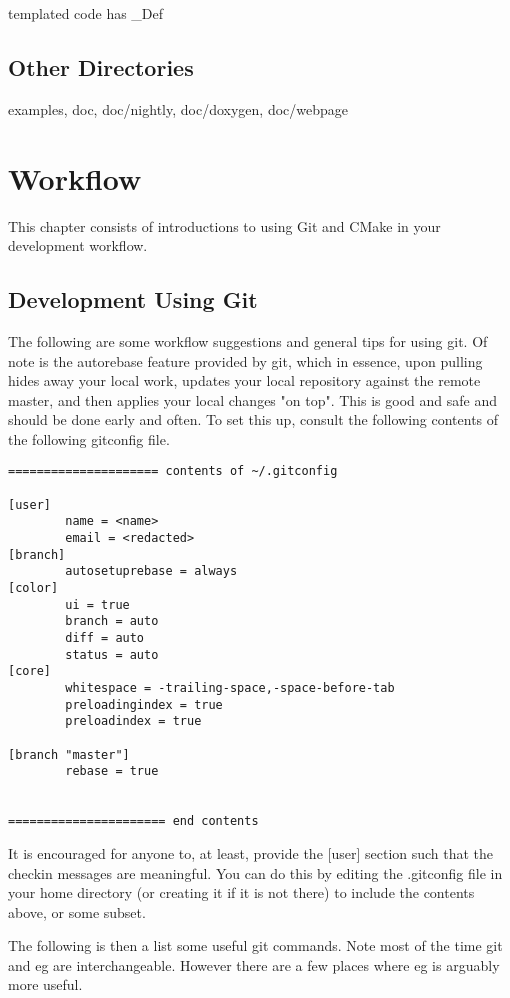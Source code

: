 \documentclass[pdf,12pt,report,strict]{SANDreport}
\theoremstyle{remark}
\begin{document}
 templated code has  \_Def

\section{Other Directories}
 examples, doc, doc/nightly, doc/doxygen, doc/webpage

\chapter{Workflow}
\label{workflow}

This chapter consists of introductions to using Git and CMake in your
development workflow.

\section{Development Using Git}

The following are some workflow suggestions and general tips for using
git. Of note is the autorebase feature provided by git, which in
essence, upon pulling hides away your local work, updates your local
repository against the remote master, and then applies your local
changes "on top". This is good and safe and should be done early and
often. To set this up, consult the following contents of the following
gitconfig file.

\begin{verbatim}
===================== contents of ~/.gitconfig

[user]
        name = <name>
        email = <redacted>
[branch]
        autosetuprebase = always
[color]
        ui = true
        branch = auto
        diff = auto
        status = auto
[core]
        whitespace = -trailing-space,-space-before-tab
        preloadingindex = true
        preloadindex = true

[branch "master"]
        rebase = true


====================== end contents
\end{verbatim}

It is encouraged for anyone to, at least, provide the [user] section
such that the checkin messages are meaningful. You can do this by
editing the .gitconfig file in your home directory (or creating it if
it is not there) to include the contents above, or some subset.

The following is then a list some useful git commands. Note most of
the time git and eg are interchangeable. However there are a few
places where eg is arguably more useful.
\end{document}
